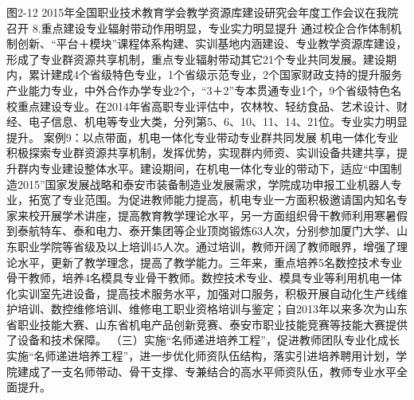 图2-12  2015年全国职业技术教育学会教学资源库建设研究会年度工作会议在我院召开
8.重点建设专业辐射带动作用明显，专业实力明显提升
通过校企合作体制机制创新、“平台＋模块”课程体系构建、实训基地内涵建设、专业教学资源库建设，形成了专业群资源共享机制，重点专业辐射带动其它21个专业共同发展。建设期内，累计建成4个省级特色专业，1个省级示范专业，2个国家财政支持的提升服务产业能力专业，中外合作办学专业2个，“3＋2”专本贯通专业1个，9个省级特色名校重点建设专业。在2014年省高职专业评估中，农林牧、轻纺食品、艺术设计、财经、电子信息、机电等专业大类，分列第5、6、10、11、14、21位。专业实力明显提升。
案例9：以点带面，机电一体化专业带动专业群共同发展
机电一体化专业积极探索专业群资源共享机制，发挥优势，实现群内师资、实训设备共建共享，提升群内专业建设整体水平。建设期间，在机电一体化专业的带动下，适应“中国制造2015”国家发展战略和泰安市装备制造业发展需求，学院成功申报工业机器人专业，拓宽了专业范围。为促进教师能力提高，机电专业一方面积极邀请国内知名专家来校开展学术讲座，提高教育教学理论水平，另一方面组织骨干教师利用寒暑假到泰航特车、泰和电力、泰开集团等企业顶岗锻炼63人次，分别参加厦门大学、山东职业学院等省级及以上培训45人次。通过培训，教师开阔了教师眼界，增强了理论水平，更新了教学理念，提高了教学能力。三年来，重点培养5名数控技术专业骨干教师，培养4名模具专业骨干教师。数控技术专业、模具专业等利用机电一体化实训室先进设备，提高技术服务水平，加强对口服务，积极开展自动化生产线维护培训、数控维修培训、维修电工职业资格培训与鉴定；自2013年以来多次为山东省职业技能大赛、山东省机电产品创新竞赛、泰安市职业技能竞赛等技能大赛提供了设备和技术保障。
（三）实施“名师递进培养工程”，促进教师团队专业化成长
实施“名师递进培养工程”，进一步优化师资队伍结构，落实引进培养聘用计划，学院建成了一支名师带动、骨干支撑、专兼结合的高水平师资队伍，教师专业水平全面提升。
   
